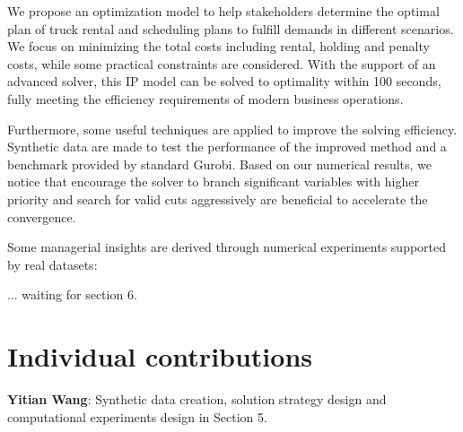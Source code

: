 \documentclass[a4paper,12pt]{article}
\begin{document}
We propose an optimization model to help stakeholders determine the optimal plan of truck rental and scheduling plans to fulfill demands in different scenarios. We focus on minimizing the total costs including rental, holding and penalty costs, while some practical constraints are considered. With the support of an advanced solver, this IP model can be solved to optimality within 100 seconds, fully meeting the efficiency requirements of modern business operations.

Furthermore, some useful techniques are applied to improve the solving efficiency. Synthetic data are made to test the performance of the improved method and a benchmark provided by standard Gurobi. Based on our numerical results, we notice that encourage the solver to branch significant variables with higher priority and search for valid cuts aggressively are beneficial to accelerate the convergence.

Some managerial insights are derived through numerical experiments supported by real datasets:

... waiting for section 6.



\section{Individual contributions}
\textbf{Yitian Wang}: Synthetic data creation, solution strategy design and computational experiments design in Section 5.
\end{document}
